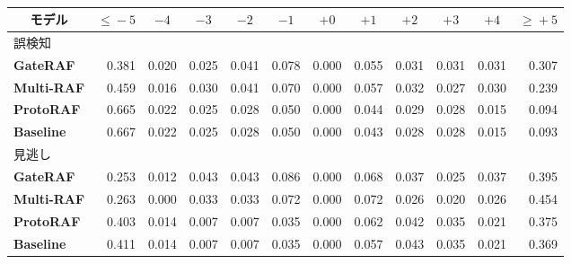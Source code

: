 \documentclass[twocolumn, lastpage]{jarticle}
\newif\ifrevmark
\newcommand{\revAcolor}{\ifrevmark\color{blue}\fi}
\begin{document}
\begin{table}[t]
{\begin{tabular}{lrrrrrrrrrrrr}
            \hline
        \end{tabular}}
        \par\vspace{8pt}
        {\revAcolor
        \\[2pt]
        \setlength{\tabcolsep}{2.5pt}%
        \begin{tabular}{lrrrrrrrrrrr}
            \hline
            \multicolumn{1}{c}{モデル} & \multicolumn{1}{c}{$\leq\!-5$} & \multicolumn{1}{c}{$-4$} & \multicolumn{1}{c}{$-3$} & \multicolumn{1}{c}{$-2$} & \multicolumn{1}{c}{$-1$} & \multicolumn{1}{c}{$+0$} & \multicolumn{1}{c}{$+1$} & \multicolumn{1}{c}{$+2$} & \multicolumn{1}{c}{$+3$} & \multicolumn{1}{c}{$+4$} & \multicolumn{1}{c}{$\geq\!+5$} \\
            \hline\hline
            \multicolumn{12}{l}{誤検知} \\
            \quad \textbf{GateRAF} & 0.381 & 0.020 & 0.025 & 0.041 & 0.078 & 0.000 & 0.055 & 0.031 & 0.031 & 0.031 & 0.307 \\
            \quad \textbf{Multi-RAF} & 0.459 & 0.016 & 0.030 & 0.041 & 0.070 & 0.000 & 0.057 & 0.032 & 0.027 & 0.030 & 0.239 \\
            \quad \textbf{ProtoRAF} & 0.665 & 0.022 & 0.025 & 0.028 & 0.050 & 0.000 & 0.044 & 0.029 & 0.028 & 0.015 & 0.094 \\
            \quad \textbf{Baseline} & 0.667 & 0.022 & 0.025 & 0.028 & 0.050 & 0.000 & 0.043 & 0.028 & 0.028 & 0.015 & 0.093 \\
            \hline
            \multicolumn{12}{l}{見逃し} \\
            \quad \textbf{GateRAF} & 0.253 & 0.012 & 0.043 & 0.043 & 0.086 & 0.000 & 0.068 & 0.037 & 0.025 & 0.037 & 0.395 \\
            \quad \textbf{Multi-RAF} & 0.263 & 0.000 & 0.033 & 0.033 & 0.072 & 0.000 & 0.072 & 0.026 & 0.020 & 0.026 & 0.454 \\
            \quad \textbf{ProtoRAF} & 0.403 & 0.014 & 0.007 & 0.007 & 0.035 & 0.000 & 0.062 & 0.042 & 0.035 & 0.021 & 0.375 \\
            \quad \textbf{Baseline} & 0.411 & 0.014 & 0.007 & 0.007 & 0.035 & 0.000 & 0.057 & 0.043 & 0.035 & 0.021 & 0.369 \\
            \hline
        \end{tabular}}
    \end{table}
\end{document}
